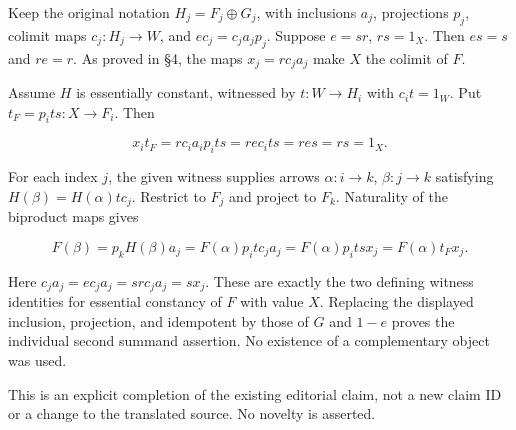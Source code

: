 \documentclass[11pt]{article}
\begin{document}
Keep the original notation \(H_j=F_j\oplus G_j\), with inclusions \(a_j\), projections \(p_j\), colimit maps \(c_j:H_j\to W\), and \(e c_j=c_j a_jp_j\). Suppose \(e=sr\), \(rs=1_X\). Then \(es=s\) and \(re=r\). As proved in §4, the maps \(x_j=rc_ja_j\) make \(X\) the colimit of \(F\).

Assume \(H\) is essentially constant, witnessed by \(t:W\to H_i\) with \(c_i t=1_W\). Put \(t_F=p_i t s:X\to F_i\). Then

\[
x_i t_F=r c_i a_i p_i t s
       =r e c_i t s=r e s=rs=1_X.
\]

For each index \(j\), the given witness supplies arrows \(\alpha:i\to k\), \(\beta:j\to k\) satisfying \(H(\beta)=H(\alpha)t c_j\). Restrict to \(F_j\) and project to \(F_k\). Naturality of the biproduct maps gives

\[
F(\beta)=p_kH(\beta)a_j
=F(\alpha)p_i t c_j a_j
=F(\alpha)p_i t s x_j
=F(\alpha)t_F x_j.
\]

Here \(c_j a_j=e c_j a_j=s r c_j a_j=sx_j\). These are exactly the two defining witness identities for essential constancy of \(F\) with value \(X\). Replacing the displayed inclusion, projection, and idempotent by those of \(G\) and \(1-e\) proves the individual second summand assertion. No existence of a complementary object was used.

This is an explicit completion of the existing editorial claim, not a new claim ID or a change to the translated source. No novelty is asserted.
\clearpage
\end{document}
